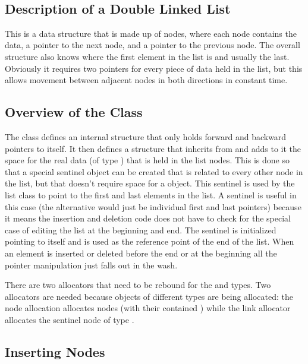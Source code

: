 \\

\subsection{Description of a Double Linked List}

This is a data structure that is made up of nodes, where each node contains
the data, a pointer to the next node, and a pointer to the previous node. The
overall structure also knows where the first element in the list is and
usually the last. Obviously it requires two pointers for every piece of data
held in the list, but this allows movement between adjacent nodes in both
directions in constant time.

\subsection{Overview of the Class}

The class defines an internal  structure that only holds
forward and backward pointers to itself. It then defines a 
structure that inherits from  and adds to it the space for
the real data (of type ) that is held in the list nodes. This
is done so that a special sentinel object can be created that is related to
every other node in the list, but that doesn't require space for a
 object. This sentinel is used by the list class to point to
the first and last elements in the list. A sentinel is useful in this case
(the alternative would just be individual first and last pointers) because it
means the insertion and deletion code does not have to check for the special
case of editing the list at the beginning and end. The sentinel is initialized
pointing to itself and is used as the reference point of the end of the list.
When an element is inserted or deleted before the end or at the beginning all
the pointer manipulation just falls out in the wash. 

There are two allocators that need to be rebound for the  and
 types. Two allocators are needed because objects of
different types are being allocated: the node allocation allocates nodes (with
their contained ) while the link allocator allocates the
sentinel node of type .

\subsection{Inserting Nodes}

